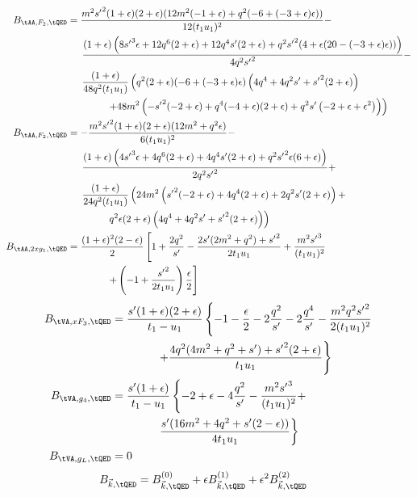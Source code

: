 \begin{align}
B_{\tAA,F_2,\tQED} &= \frac{{m^2} {s'}^2 (1+\epsilon ) (2+\epsilon ) (12 {m^2} (-1+\epsilon )+{q^2} (-6+(-3+\epsilon ) \epsilon ))}{12 (t_1 u_1)^2}-\nonumber\\
 &\hspace{15pt} \frac{(1+\epsilon ) \left(8 {s'}^3 \epsilon +12 {q^6} (2+\epsilon )+12 {q^4} {s'} (2+\epsilon )+{q^2} {s'}^2 (4+\epsilon  (20-(-3+\epsilon ) \epsilon ))\right)}{4 {q^2} {s'}^2}-\nonumber\\
 &\hspace{15pt}\frac{(1+\epsilon )}{48 {q^2} (t_1 u_1)}\left({q^2} (2+\epsilon ) (-6+(-3+\epsilon ) \epsilon ) \left(4 {q^4}+4 {q^2} {s'}+{s'}^2 (2+\epsilon )\right)\right.\nonumber\\
 &\hspace{40pt} \left. +48 {m^2} \left(-{s'}^2 (-2+\epsilon )+{q^4} (-4+\epsilon ) (2+\epsilon )+{q^2} {s'} \left(-2+\epsilon +\epsilon ^2\right)\right)\right)\\
B_{\tAA,F_2,\tQED} &= -\frac{{m^2} {s'}^2 (1+\epsilon ) (2+\epsilon ) (12 {m^2}+{q^2} \epsilon )}{6 (t_1 u_1)^2}-\nonumber\\
 &\hspace{15pt}\frac{(1+\epsilon ) \left(4 {s'}^3 \epsilon +4 {q^6} (2+\epsilon )+4 {q^4} {s'} (2+\epsilon )+{q^2} {s'}^2 \epsilon  (6+\epsilon )\right)}{2 {q^2} {s'}^2}+\nonumber\\
 &\hspace{15pt}\frac{(1+\epsilon )}{24 {q^2} (t_1 u_1)} \left(24 {m^2} \left({s'}^2 (-2+\epsilon )+4 {q^4} (2+\epsilon )+2 {q^2} {s'} (2+\epsilon )\right)+\right.\nonumber\\
 &\hspace{40pt} \left. {q^2} \epsilon  (2+\epsilon ) \left(4 {q^4}+4 {q^2} {s'}+{s'}^2 (2+\epsilon )\right)\right)\\
B_{\tAA,2xg_1,\tQED} &= \frac{(1+\epsilon)^2(2-\epsilon)}{2}\left[1+\frac{2q^2}{s'}-\frac{2s'(2m^2+q^2)+{s'}^2}{2t_1u_1} + \frac{m^2{s'}^3}{(t_1u_1)^2} \right.\nonumber\\
&\hspace{40pt}\left. + \left(-1+\frac{{s'}^2}{2t_1u_1}\right)\frac{\epsilon}{2}\right]
\end{align}
\begin{align}
B_{\tVA,xF_3,\tQED} &= \frac{s'(1+\epsilon)(2+\epsilon)}{t_1-u_1}\left\{-1-\frac{\epsilon}{2}-2\frac{q^2}{{s'}} - 2\frac{q^4}{{s'}}- \frac{m^2q^2{s'}^2}{2(t_1u_1)^2} \right.\nonumber\\
 &\hspace{40pt}\left. + \frac{4q^2(4m^2+q^2+s')+{s'}^2(2+\epsilon)}{t_1 u_1}\right\}\\
B_{\tVA,g_4,\tQED} &= \frac{s'(1+\epsilon)}{t_1-u_1}\left\{-2+\epsilon - 4\frac{q^2}{s'} - \frac{m^2{s'}^3}{(t_1u_1)^2} + \right.\nonumber\\
 &\hspace{40pt}\left. \frac{s'(16m^2 + 4q^2 + s'(2-\epsilon))}{4 t_1 u_1} \right\}\\
B_{\tVA,g_L,\tQED} &= 0
\end{align}
\begin{align}
B_{\vec k,\tQED} &= B^{(0)}_{\vec k,\tQED} + \epsilon B^{(1)}_{\vec k,\tQED} + \epsilon^2 B^{(2)}_{\vec k,\tQED}
\end{align}

